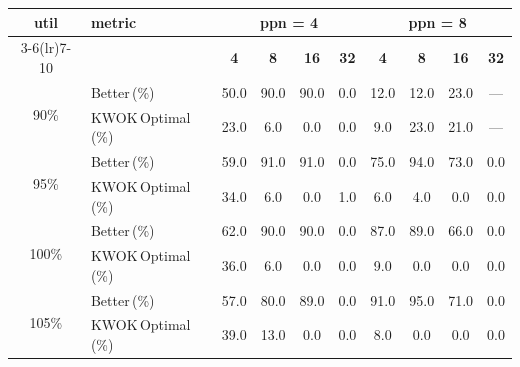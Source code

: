 \begin{tabular}{@{}c l *{8}{c}@{}}
\toprule
\multirow{2}{*}{\textbf{util}} & \multirow{2}{*}{\textbf{metric}} &\multicolumn{4}{c}{\textbf{ppn = 4}} & \multicolumn{4}{c}{\textbf{ppn = 8}}\\
\cmidrule(lr){3-6}\cmidrule(lr){7-10}
 &  & \textbf{4} & \textbf{8} & \textbf{16} & \textbf{32} & \textbf{4} & \textbf{8} & \textbf{16} & \textbf{32}\\
\midrule
\multirow{2}{*}{90\%}
& Better\,(\%) & 50.0 & 90.0 & 90.0 & 0.0 & 12.0 & 12.0 & 23.0 & \multicolumn{1}{c}{—} \\
& KWOK\,Optimal\,(\%) & 23.0 & 6.0 & 0.0 & 0.0 & 9.0 & 23.0 & 21.0 & \multicolumn{1}{c}{—} \\
\midrule
\multirow{2}{*}{95\%}
& Better\,(\%) & 59.0 & 91.0 & 91.0 & 0.0 & 75.0 & 94.0 & 73.0 & 0.0 \\
& KWOK\,Optimal\,(\%) & 34.0 & 6.0 & 0.0 & 1.0 & 6.0 & 4.0 & 0.0 & 0.0 \\
\midrule
\multirow{2}{*}{100\%}
& Better\,(\%) & 62.0 & 90.0 & 90.0 & 0.0 & 87.0 & 89.0 & 66.0 & 0.0 \\
& KWOK\,Optimal\,(\%) & 36.0 & 6.0 & 0.0 & 0.0 & 9.0 & 0.0 & 0.0 & 0.0 \\
\midrule
\multirow{2}{*}{105\%}
& Better\,(\%) & 57.0 & 80.0 & 89.0 & 0.0 & 91.0 & 95.0 & 71.0 & 0.0 \\
& KWOK\,Optimal\,(\%) & 39.0 & 13.0 & 0.0 & 0.0 & 8.0 & 0.0 & 0.0 & 0.0 \\
\bottomrule
\end{tabular}

